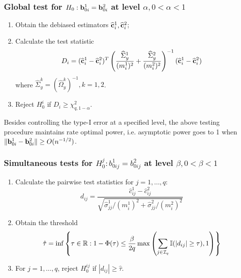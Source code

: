 \documentclass[10pt]{beamer}
\theoremstyle{definition}
\begin{document}
\begin{frame}
\frametitle{Global test for $H_0: {\bf{b}}_{0 i}^1 = {\bf{b}}_{0 i}^2$ at level $\alpha, 0< \alpha< 1$}

\begin{enumerate}
\item Obtain the debiased estimators $\widehat {{\bf{c}}}_i^1, \widehat {{\bf{c}}}_i^2$;

\item Calculate the test statistic
%
$$
D_i = (\widehat {{\bf{c}}}_i^1 - \widehat {{\bf{c}}}_i^2)^T
\left( \frac{ \widehat \Sigma_y^1}{(m_i^1)^2} +
\frac{\widehat \Sigma_y^2}{(m_i^2)^2} \right)^{-1} (\widehat {{\bf{c}}}_i^1 - \widehat {{\bf{c}}}_i^2)
$$
%
where $\widehat \Sigma_y^k = (\widehat \Omega_y^k)^{-1}, k = 1,2$.

\item  Reject $H_0^i$ if $D_i \geq \chi^2_{q, 1-\alpha}$.
\end{enumerate}

\vspace{1em}
Besides controlling the type-I error at a specified level, the above testing procedure maintains rate optimal power, i.e. asymptotic power goes to 1 when $\| {\bf{b}}_{0i}^1 - {\bf{b}}_{0i}^2\| \geq O(n^{-1/2})$.
\end{frame}

\begin{frame}
\frametitle{Simultaneous tests for $H_0^{j}: b_{0 ij}^1 = b_{0 ij}^2$ at level $\beta, 0< \beta < 1$}

\begin{enumerate}
\item Calculate the pairwise test statistics for $j = 1, \ldots, q$:
$$
d_{ij} = \frac{\widehat c_{ij}^1 - \widehat c_{ij}^2}{\sqrt{\hat \sigma_{jj}^1/ (m_i^1)^2 + \hat \sigma_{jj}^2/ (m_i^2)^2}}
$$

\item Obtain the threshold
%
$$
\hat \tau = \inf \left\{\tau \in {\mathbb{R}}: 1 - \Phi(\tau) \leq \frac{\beta}{2 q}
\max \left( \sum_{j \in {\cal{I}}_q} {\mathbb{I}}( |d_{ij}| \geq \tau), 1 \right) \right\}
$$
%

\item For $j = 1, \ldots, q$, reject $H_0^{ij}$ if $|d_{ij}| \geq \hat \tau$.

\end{enumerate} 
\end{frame}
\end{document}
